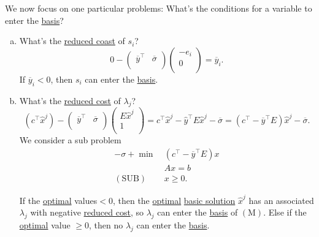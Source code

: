 \begin{prev}
	We now focus on one particular problems: What's the conditions for a variable to enter the \hyperref[def:basis]{basis}?
	\begin{enumerate}[(a)]
		\item What's the \hyperref[def:reduced-cost]{reduced coast} of \(s_{i}\)?
		      \[
			      0 - \begin{pmatrix}
				      \overline{y}^{\top} & \overline{\sigma} \\
			      \end{pmatrix}\begin{pmatrix}
				      -e_{i} \\
				      0      \\
			      \end{pmatrix} = \overline{y}_i.
		      \]
		      If \(\overline{y}_i<0\), then \(s_{i}\) can enter the \hyperref[def:basis]{basis}.
		\item What's the \hyperref[def:reduced-cost]{reduced cost} of \(\lambda_{j}\)?
		      \[
			      (c^{\top}\hat{x}^j) - \begin{pmatrix}
				      \overline{y}^{\top} & \overline{\sigma} \\
			      \end{pmatrix}\begin{pmatrix}
				      E\hat{x}^j \\
				      1          \\
			      \end{pmatrix} = c^{\top}\hat{x}^j - \hat{y}^{\top}E\hat{x}^j - \overline{\sigma} = (c^{\top} - \overline{y}^{\top}E)\hat{x}^j - \overline{\sigma}.
		      \]
		      We consider a sub problem
		      \[
			      \begin{aligned}
				      -\sigma + \min~     & (c^{\top} - \overline{y}^{\top}E)x \\
				                          & Ax = b                             \\
				      (\mathrm{SUB})\quad & x\geq 0.
			      \end{aligned}
		      \]

		      If the \hyperref[def:optimal-solution]{optimal} values\(<0\), then the \hyperref[def:optimal-solution]{optimal} \hyperref[def:basic-solution]{basic solution} \(\hat{x}^j\) has an associated \(\lambda_{j}\) with negative \hyperref[def:reduced-cost]{reduced cost}, so \(\lambda_{j}\) can enter the \hyperref[def:basis]{basis} of \((\mathrm{M})\). Else if the \hyperref[def:optimal-solution]{optimal} value \(\geq 0\), then no \(\lambda_{j}\) can enter the \hyperref[def:basis]{basis}.


\end{enumerate}
\end{prev}
